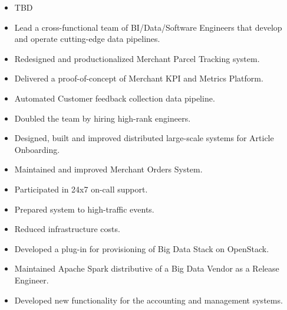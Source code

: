 \documentclass{altacv}
\begin{document}

\makecvheader



\begin{paracol}{2}

\begin{itemize}
    \item TBD
\end{itemize}
\divider
{}
\begin{itemize}
    \item {Lead a cross-functional team of BI/Data/Software Engineers that develop and operate cutting-edge data pipelines.}
    \item {Redesigned and productionalized Merchant Parcel Tracking system.}
    \item {Delivered a proof-of-concept of Merchant KPI and Metrics Platform.}
    \item {Automated Customer feedback collection data pipeline.}
    \item {Doubled the team by hiring high-rank engineers.}
\end{itemize}
\divider
{}
\begin{itemize}
    \item {Designed, built and improved distributed large-scale systems for Article Onboarding.}
    \item {Maintained and improved Merchant Orders System.}
    \item {Participated in 24x7 on-call support.}
    \item {Prepared system to high-traffic events.}
    \item {Reduced infrastructure costs.}
\end{itemize}
\divider
{}
\begin{itemize}
    \item {Developed a plug-in for provisioning of Big Data Stack on OpenStack.}
    \item {Maintained Apache Spark distributive of a Big Data Vendor as a Release Engineer.}
\end{itemize}
\divider
{}
\begin{itemize}
    \item {Developed new functionality for the accounting and management systems.}
\end{itemize}


\end{paracol}
\end{document}
